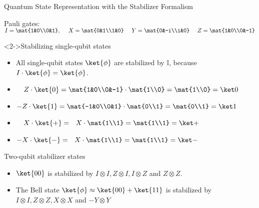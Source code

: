 \begin{frame}{Quantum State Representation with the
					\alert{Stabilizer Formalism}}

Pauli gates:~~~~ $I = \mat{1&0\\0&1},~~~~X = \mat{0&1\\1&0} ~~~~Y = \mat{0&-i\\i&0}~~~~Z = \mat{1&0\\0&-1}$

\begin{exampleblock}<2->{Stabilizing single-qubit states}

\begin{itemize}
	\item 
All single-qubit states $\ket{\phi}$ are stabilized by $\mathbb{I}$, because $I \cdot \ket{\phi}= \ket{\phi}$.

\item ~~$Z \cdot \ket{0} = \mat{1&0\\0&-1} \cdot \mat{1\\0} = \mat{1\\0} = \ket 0$
\item $-Z \cdot \ket{1} = \mat{-1&0\\0&1} \cdot \mat{0\\1} = \mat{0\\1} = \ket 1$
\pause
\item
{}
\pause
 ~~$X \cdot \ket{+} = ~~X \cdot \mat{1\\1} = \mat{1\\1} = \ket +$ 
\pause
\item
 $-X \cdot \ket{-} = ~~X \cdot \mat{1\\1} = \mat{1\\1} = \ket -$ 
\end{itemize}

\end{exampleblock}



\pause
\begin{exampleblock}{Two-qubit stabilizer states}

\begin{itemize}
	\item  $\ket{00}$ is stabilized by $I \otimes I, Z\otimes I, I\otimes Z$ and $Z\otimes Z$.
	\item The Bell state $
    \ket{\phi} \approx  \ket{00} + \ket{11}
$ is stabilized by $I \otimes I, Z\otimes Z, X\otimes X$ and $-Y\otimes Y$
\end{itemize}


\end{exampleblock}
\end{frame}
